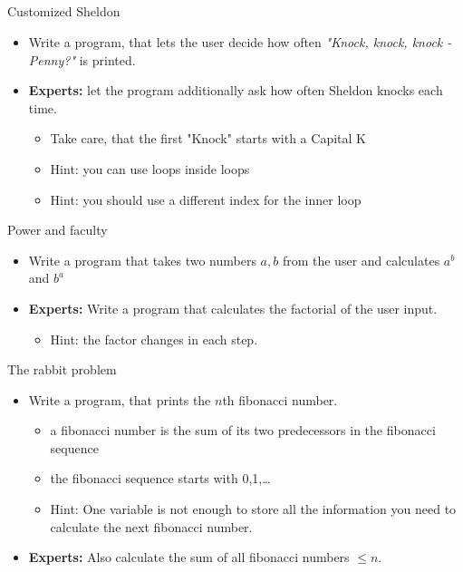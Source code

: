 \subsection{}
\begin{frame}{Customized Sheldon}
	\begin{itemize}
		\item Write a program, that lets the user decide how often \textit{"Knock, knock, knock - Penny?"} is printed.
		\item \textbf{Experts:} let the program additionally ask how often Sheldon knocks each time.
		\begin{itemize}
			\item Take care, that the first "Knock" starts with a Capital K
			\item<2-> Hint: you can use loops inside loops
			\item<3-> Hint: you should use a different index for the inner loop
		\end{itemize}
	\end{itemize}
\end{frame}
\begin{frame}{Power and faculty}
	\begin{itemize}
		\item Write a program that takes two numbers $a, b$ from the user and calculates $a^b$ and $b^a$
		\item \textbf{Experts:} Write a program that calculates the factorial of the user input.
		\begin{itemize}
			\item<2-> Hint: the factor changes in each step.
		\end{itemize}
	\end{itemize}
\end{frame}
\begin{frame}{The rabbit problem}
	\begin{itemize}
		\item Write a program, that prints the $n$th fibonacci number.
		\begin{itemize}
			\item a fibonacci number is the sum of its two predecessors in the fibonacci sequence
			\item the fibonacci sequence starts with 0,1,\dots
			\item<2-> Hint: One variable is not enough to store all the information you need to calculate the next fibonacci number.
		\end{itemize}
		\item \textbf{Experts:} Also calculate the sum of all fibonacci numbers $\leq n$.
	\end{itemize}
\end{frame}

